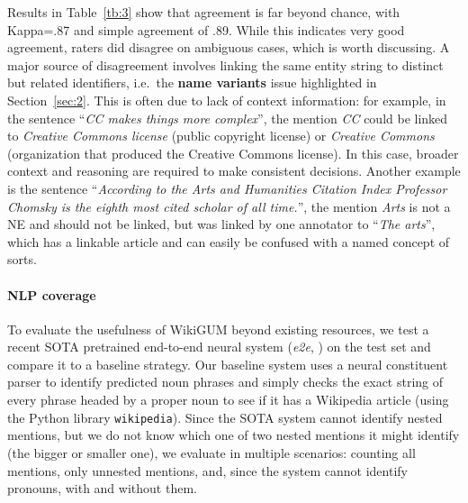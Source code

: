 \documentclass[11pt,a4paper]{article}
\begin{document}
Results in Table~\ref{tb:3} show that agreement is far beyond chance, with Kappa=.87 and simple agreement of .89. While this indicates very good agreement, raters did disagree on ambiguous cases, which is worth discussing. A major source of disagreement involves linking the same entity string to distinct but related identifiers, i.e.~the \textbf{name variants} issue highlighted in Section~\ref{sec:2}. This is often due to lack of context information: for example, in the sentence ``\textit{CC makes things more complex}'', the mention \textit{CC} could be linked to \textit{Creative Commons license} (public copyright license) or \textit{Creative Commons} (organization that produced the Creative Commons license). In this case, broader context and reasoning are required to make consistent decisions. Another example is the sentence ``\textit{According to the Arts and Humanities Citation Index Professor Chomsky is the eighth most cited scholar of all time.}'', the mention \textit{Arts} is not a NE and should not be linked, but was linked by one annotator to ``\textit{The arts}'', which has a linkable article and can easily be confused with a named concept of sorts. 







\paragraph{NLP coverage} 

To evaluate the usefulness of WikiGUM beyond existing resources, we test a recent SOTA pretrained end-to-end neural system (\textit{e2e}, \citealt{kolitsas-etal-2018-end}) on the test set and compare it to a baseline strategy. Our baseline system uses a neural constituent parser \cite{mrini-etal-2020-rethinking} to identify predicted noun phrases and simply checks the exact string of every phrase headed by a proper noun to see if it has a Wikipedia article (using the Python library \texttt{wikipedia}). Since the SOTA system cannot identify nested mentions, but we do not know which one of two nested mentions it might identify (the bigger or smaller one), we evaluate in multiple scenarios: counting all mentions, only unnested mentions, and, since the system cannot identify pronouns, with and without them.
\end{document}
